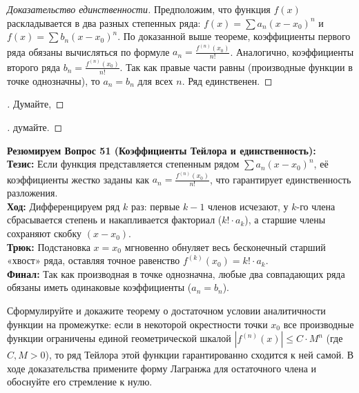 \begin{proof}[Доказательство единственности]
Предположим, что функция $f(x)$ раскладывается в два разных степенных ряда: $f(x) = \sum a_n(x-x_0)^n$ и $f(x) = \sum b_n(x-x_0)^n$. По доказанной выше теореме, коэффициенты первого ряда обязаны вычисляться по формуле $a_n = \frac{f^{(n)}(x_0)}{n!}$. Аналогично, коэффициенты второго ряда $b_n = \frac{f^{(n)}(x_0)}{n!}$. Так как правые части равны (производные функции в точке однозначны), то $a_n = b_n$ для всех $n$. Ряд единственен.
\end{proof}
\begin{proof}[]
Думайте,
\end{proof}
\begin{proof}[]
думайте.
\end{proof}



\begin{tcolorbox}[colback=gray!5, colframe=black, boxrule=0.5pt, arc=0pt]
\textbf{Резюмируем Вопрос 51 (Коэффициенты Тейлора и единственность):} \\
\textbf{Тезис:} Если функция представляется степенным рядом $\sum a_n(x-x_0)^n$, её коэффициенты жестко заданы как $a_n = \frac{f^{(n)}(x_0)}{n!}$, что гарантирует единственность разложения. \\
\textbf{Ход:} Дифференцируем ряд $k$ раз: первые $k-1$ членов исчезают, у $k$-го члена сбрасывается степень и накапливается факториал ($k! \cdot a_k$), а старшие члены сохраняют скобку $(x-x_0)$. \\
\textbf{Трюк:} Подстановка $x = x_0$ мгновенно обнуляет весь бесконечный старший «хвост» ряда, оставляя точное равенство $f^{(k)}(x_0) = k! \cdot a_k$. \\
\textbf{Финал:} Так как производная в точке однозначна, любые два совпадающих ряда обязаны иметь одинаковые коэффициенты ($a_n = b_n$).
\end{tcolorbox}





{Сформулируйте и докажите теорему о достаточном условии аналитичности функции на промежутке: если в некоторой окрестности точки $x_0$ все производные функции ограничены единой геометрической шкалой $|f^{(n)}(x)| \le C \cdot M^n$ (где $C, M > 0$), то ряд Тейлора этой функции гарантированно сходится к ней самой. В ходе доказательства примените форму Лагранжа для остаточного члена и обоснуйте его стремление к нулю.}

